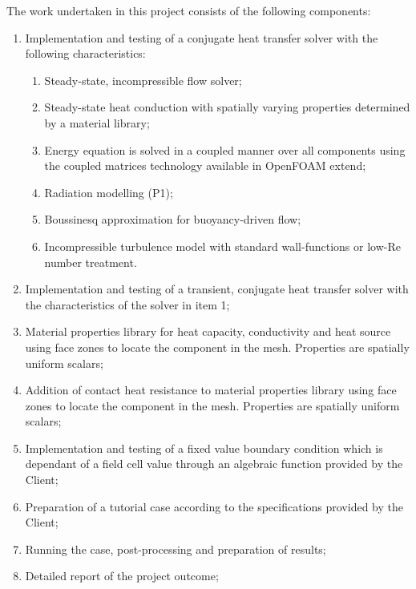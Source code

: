 The work undertaken in this project consists of the following components:
%
\begin{enumerate}
\item Implementation and testing of a conjugate heat transfer solver with the
  following characteristics:

\begin{enumerate}
  \item Steady-state, incompressible flow solver;
  \item Steady-state heat conduction with spatially varying properties
    determined by a material library;
  \item Energy equation is solved in a coupled manner over all components using
    the coupled matrices technology available in OpenFOAM extend;
  \item Radiation modelling (P1);
  \item Boussinesq approximation for buoyancy-driven flow;
  \item Incompressible turbulence model with standard wall-functions or low-Re
    number treatment.
\end{enumerate}

\item Implementation and testing of a transient, conjugate heat transfer solver
  with the characteristics of the solver in item 1;

\item Material properties library for heat capacity, conductivity and heat
  source using face zones to locate the component in the mesh.
  Properties are spatially uniform scalars;

\item Addition of contact heat resistance to material properties library using
  face zones to locate the component in the mesh. Properties are spatially
  uniform scalars;

\item Implementation and testing of a fixed value boundary condition which is
  dependant of a field cell value through an algebraic function provided by the
  Client; \label{item:customBC}

\item Preparation of a tutorial case according to the specifications provided by
  the Client;

\item Running the case, post-processing and preparation of results;

\item Detailed report of the project outcome;

\end{enumerate}
%

